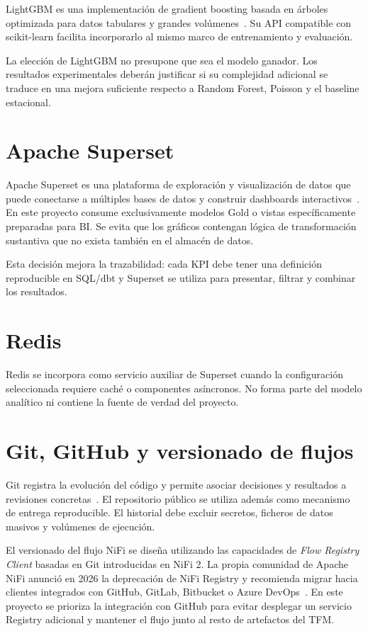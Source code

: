 LightGBM es una implementación de gradient boosting basada en árboles optimizada para datos tabulares y grandes volúmenes~\cite{ke2017,lightgbm_docs}. Su API compatible con scikit-learn facilita incorporarlo al mismo marco de entrenamiento y evaluación.

La elección de LightGBM no presupone que sea el modelo ganador. Los resultados experimentales deberán justificar si su complejidad adicional se traduce en una mejora suficiente respecto a Random Forest, Poisson y el baseline estacional.

\section{Apache Superset}

Apache Superset es una plataforma de exploración y visualización de datos que puede conectarse a múltiples bases de datos y construir dashboards interactivos~\cite{superset_docs}. En este proyecto consume exclusivamente modelos Gold o vistas específicamente preparadas para BI\@. Se evita que los gráficos contengan lógica de transformación sustantiva que no exista también en el almacén de datos.

Esta decisión mejora la trazabilidad: cada KPI debe tener una definición reproducible en SQL/dbt y Superset se utiliza para presentar, filtrar y combinar los resultados.

\section{Redis}

Redis se incorpora como servicio auxiliar de Superset cuando la configuración seleccionada requiere caché o componentes asíncronos. No forma parte del modelo analítico ni contiene la fuente de verdad del proyecto.

\section{Git, GitHub y versionado de flujos}

Git registra la evolución del código y permite asociar decisiones y resultados a revisiones concretas~\cite{git_docs}. El repositorio público se utiliza además como mecanismo de entrega reproducible. El historial debe excluir secretos, ficheros de datos masivos y volúmenes de ejecución.

El versionado del flujo NiFi se diseña utilizando las capacidades de \textit{Flow Registry Client} basadas en Git introducidas en NiFi 2. La propia comunidad de Apache NiFi anunció en 2026 la deprecación de NiFi Registry y recomienda migrar hacia clientes integrados con GitHub, GitLab, Bitbucket o Azure DevOps~\cite{nifi_registry}. En este proyecto se prioriza la integración con GitHub para evitar desplegar un servicio Registry adicional y mantener el flujo junto al resto de artefactos del TFM\@.

